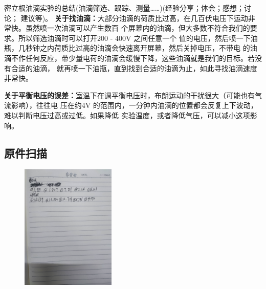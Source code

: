 \documentclass[dvipsnames, svgnames,a4paper,11pt]{article}
\begin{document}
\begin{question}
	密立根油滴实验的总结(油滴筛选、跟踪、测量……)(经验分享；体会；感想；讨论；
	建议等)。
	\tcblower
	\textbf{关于找油滴：}大部分油滴的荷质比过高，在几百伏电压下运动非常快。虽然喷一次油滴可以产生数百
	个屏幕内的油滴，但大多数不符合我们的要求。所以筛选油滴时可以打开200 - 400V 之间任意一个
	值的电压，然后喷一下油瓶，几秒钟之内荷质比过高的油滴会快速离开屏幕，然后关掉电压，不带电
	的油滴不作任何反应，带少量电荷的油滴会缓慢下降，这些油滴就是我们的目标。若没有合适的油滴，
	就再喷一下油瓶，直到找到合适的油滴为止，如此寻找油滴速度非常快。

	\textbf{关于平衡电压的误差：}室温下在调平衡电压时，布朗运动的干扰很大（可能也有气流影响），往往电
	压在约4V 的范围内，一分钟内油滴的位置都会反复上下波动，难以判断电压过高或过低。如果降低
	实验温度，或者降低气压，可以减小这项影响。
\end{question}
\clearpage




\clearpage
\appendix
\appendixpage
\addappheadtotoc
%
\subsection*{原件扫描}
%
\begin{figure}[H]
	\centering
	\includegraphics[width=0.4\textwidth]{实验7原件1.jpg}
\end{figure}
\end{document}

